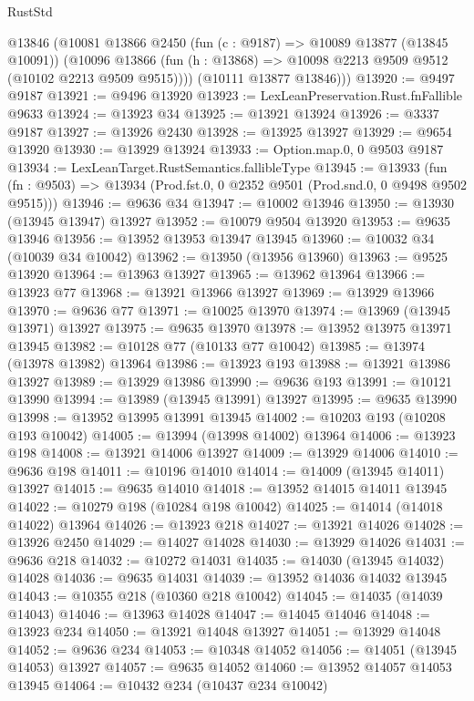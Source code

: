 \begin{lexlean}{RustStd}
\begin{coremodule}
        @13846
        (@10081
          @13866
          @2450
          (fun (c : @9187) => @10089 @13877 (@13845 @10091))
          (@10096 @13866 (fun (h : @13868) => @10098 @2213 @9509 @9512 (@10102 @2213 @9509 @9515))))
        (@10111 @13877 @13846)))
@13920 := @9497 @9187
@13921 := @9496 @13920
@13923 := LexLeanPreservation.Rust.fnFallible @9633
@13924 := @13923 @34
@13925 := @13921 @13924
@13926 := @3337 @9187
@13927 := @13926 @2430
@13928 := @13925 @13927
@13929 := @9654 @13920
@13930 := @13929 @13924
@13933 := Option.map.{0, 0} @9503 @9187
@13934 := LexLeanTarget.RustSemantics.fallibleType
@13945 := @13933
    (fun (fn : @9503) => @13934 (Prod.fst.{0, 0} @2352 @9501 (Prod.snd.{0, 0} @9498 @9502 @9515)))
@13946 := @9636 @34
@13947 := @10002 @13946
@13950 := @13930 (@13945 @13947) @13927
@13952 := @10079 @9504 @13920
@13953 := @9635 @13946
@13956 := @13952 @13953 @13947 @13945
@13960 := @10032 @34 (@10039 @34 @10042)
@13962 := @13950 (@13956 @13960)
@13963 := @9525 @13920
@13964 := @13963 @13927
@13965 := @13962 @13964
@13966 := @13923 @77
@13968 := @13921 @13966 @13927
@13969 := @13929 @13966
@13970 := @9636 @77
@13971 := @10025 @13970
@13974 := @13969 (@13945 @13971) @13927
@13975 := @9635 @13970
@13978 := @13952 @13975 @13971 @13945
@13982 := @10128 @77 (@10133 @77 @10042)
@13985 := @13974 (@13978 @13982) @13964
@13986 := @13923 @193
@13988 := @13921 @13986 @13927
@13989 := @13929 @13986
@13990 := @9636 @193
@13991 := @10121 @13990
@13994 := @13989 (@13945 @13991) @13927
@13995 := @9635 @13990
@13998 := @13952 @13995 @13991 @13945
@14002 := @10203 @193 (@10208 @193 @10042)
@14005 := @13994 (@13998 @14002) @13964
@14006 := @13923 @198
@14008 := @13921 @14006 @13927
@14009 := @13929 @14006
@14010 := @9636 @198
@14011 := @10196 @14010
@14014 := @14009 (@13945 @14011) @13927
@14015 := @9635 @14010
@14018 := @13952 @14015 @14011 @13945
@14022 := @10279 @198 (@10284 @198 @10042)
@14025 := @14014 (@14018 @14022) @13964
@14026 := @13923 @218
@14027 := @13921 @14026
@14028 := @13926 @2450
@14029 := @14027 @14028
@14030 := @13929 @14026
@14031 := @9636 @218
@14032 := @10272 @14031
@14035 := @14030 (@13945 @14032) @14028
@14036 := @9635 @14031
@14039 := @13952 @14036 @14032 @13945
@14043 := @10355 @218 (@10360 @218 @10042)
@14045 := @14035 (@14039 @14043)
@14046 := @13963 @14028
@14047 := @14045 @14046
@14048 := @13923 @234
@14050 := @13921 @14048 @13927
@14051 := @13929 @14048
@14052 := @9636 @234
@14053 := @10348 @14052
@14056 := @14051 (@13945 @14053) @13927
@14057 := @9635 @14052
@14060 := @13952 @14057 @14053 @13945
@14064 := @10432 @234 (@10437 @234 @10042)

\end{coremodule}
\end{lexlean}

